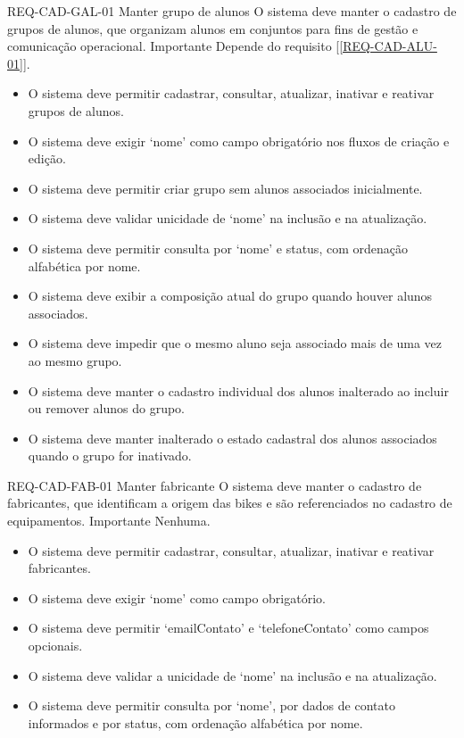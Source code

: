 \reqfunccad
{REQ-CAD-GAL-01 Manter grupo de alunos}
{O sistema deve manter o cadastro de grupos de alunos, que organizam alunos em conjuntos para fins de gestão e comunicação operacional.}
{Importante}
{Depende do requisito [\ref{REQ-CAD-ALU-01}].}
{\begin{itemize}[leftmargin=0.6cm]
    \item O sistema deve permitir cadastrar, consultar, atualizar, inativar e reativar grupos de alunos.
    \item O sistema deve exigir `nome' como campo obrigatório nos fluxos de criação e edição.
    \item O sistema deve permitir criar grupo sem alunos associados inicialmente.
    \item O sistema deve validar unicidade de `nome' na inclusão e na atualização.
    \item O sistema deve permitir consulta por `nome' e status, com ordenação alfabética por nome.
    \item O sistema deve exibir a composição atual do grupo quando houver alunos associados.
    \item O sistema deve impedir que o mesmo aluno seja associado mais de uma vez ao mesmo grupo.
    \item O sistema deve manter o cadastro individual dos alunos inalterado ao incluir ou remover alunos do grupo.
    \item O sistema deve manter inalterado o estado cadastral dos alunos associados quando o grupo for inativado.
\end{itemize}}


\reqfunccad
{REQ-CAD-FAB-01 Manter fabricante}
{O sistema deve manter o cadastro de fabricantes, que identificam a origem das bikes e são referenciados no cadastro de equipamentos.}
{Importante}
{Nenhuma.}
{\begin{itemize}[leftmargin=0.6cm]
    \item O sistema deve permitir cadastrar, consultar, atualizar, inativar e reativar fabricantes.
    \item O sistema deve exigir `nome' como campo obrigatório.
    \item O sistema deve permitir `emailContato' e `telefoneContato' como campos opcionais.
    \item O sistema deve validar a unicidade de `nome' na inclusão e na atualização.
    \item O sistema deve permitir consulta por `nome', por dados de contato informados e por status, com ordenação alfabética por nome.
\end{itemize}}


